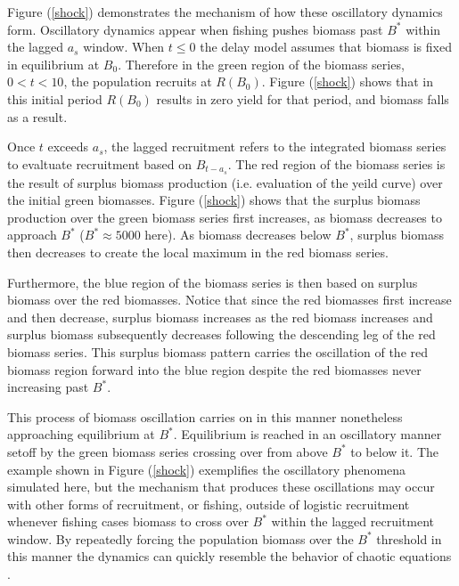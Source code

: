 %
\clearpage

%
Figure (\ref{shock}) demonstrates the mechanism of how these oscillatory
dynamics form. Oscillatory dynamics appear when fishing pushes biomass past
$B^*$ within the lagged $a_s$ window. %
When $t\le0$ the delay model assumes that biomass is fixed in equilibrium at $B_0$. 
Therefore in the green region of the biomass series, $0<t<10$, the population recruits 
at $R(B_0)$. Figure (\ref{shock}) shows that in this initial period $R(B_0)$ results in 
zero yield for that period, and biomass falls as a result.

%
Once $t$ exceeds $a_s$, the lagged recruitment refers to the integrated
biomass series to evaltuate recruitment based on $B_{t-a_s}$. The red
region of the biomass series is the result of surplus biomass production 
(i.e. evaluation of the yeild curve) %
over the initial green biomasses. Figure (\ref{shock}) shows that the %
surplus biomass production over the green biomass series first increases, 
as biomass decreases to approach $B^*$ ($B^*\approx5000$ here). As biomass 
decreases below $B^*$, surplus biomass then decreases to create
the local maximum in the red biomass series.

%
Furthermore, the blue region of the biomass series is then based on surplus biomass %
over the red biomasses. Notice that since the red biomasses first increase and
then decrease, surplus biomass %
increases as the red biomass increases and surplus biomass subsequently decreases  %
following the descending leg of the red biomass series. This %
surplus biomass pattern carries the oscillation of the red biomass region
forward into the blue region despite the red biomasses never increasing past $B^*$. 

%
This process of biomass oscillation carries on in this manner nonetheless
approaching equilibrium at $B^*$. Equilibrium is reached in an oscillatory
manner setoff by the green biomass series crossing over from above $B^*$
to below it. The example shown in Figure (\ref{shock}) exemplifies the oscillatory 
phenomena simulated here, but the mechanism that produces these oscillations may
occur with other forms of recruitment, or fishing, outside of logistic recruitment 
whenever fishing cases biomass to cross over $B^*$ within the lagged recruitment 
window. By repeatedly forcing the population biomass over the $B^*$ threshold in 
this manner the dynamics can quickly resemble the behavior of chaotic equations \cite{ausloos_logistic_2006, sprott_simple_2007}. %

